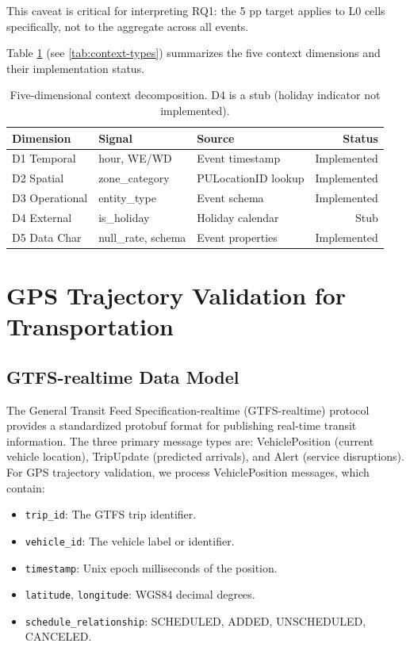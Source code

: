 This caveat is critical for interpreting RQ1: the 5 pp target applies to
L0 cells specifically, not to the aggregate across all events.

Table \ref{tab:context-types} (see \autoref{tab:context-types}) summarizes
the five context dimensions and their implementation status.

\begin{table}[htbp]
  \centering
  \caption{Five-dimensional context decomposition. D4 is a stub
    (holiday indicator not implemented).}
  \label{tab:context-types}
  \begin{tabular}{lllr}
    \toprule
    Dimension       & Signal              & Source             & Status \\
    \midrule
    D1 Temporal    & hour, WE/WD         & Event timestamp    & Implemented \\
    D2 Spatial     & zone\_category      & PULocationID lookup & Implemented \\
    D3 Operational & entity\_type        & Event schema      & Implemented \\
    D4 External   & is\_holiday         & Holiday calendar   & Stub        \\
    D5 Data Char   & null\_rate, schema  & Event properties   & Implemented \\
    \bottomrule
  \end{tabular}
\end{table}

\section{GPS Trajectory Validation for Transportation}
\label{sec:gps-validation}

\subsection{GTFS-realtime Data Model}

The General Transit Feed Specification-realtime (GTFS-realtime) protocol
\citep{gtfsrt_spec} provides a standardized protobuf format for publishing
real-time transit information. The three primary message types are:
VehiclePosition (current vehicle location), TripUpdate (predicted arrivals),
and Alert (service disruptions). For GPS trajectory validation, we process
VehiclePosition messages, which contain:

\begin{itemize}
  \itemsep0em
  \item \texttt{trip\_id}: The GTFS trip identifier.
  \item \texttt{vehicle\_id}: The vehicle label or identifier.
  \item \texttt{timestamp}: Unix epoch milliseconds of the position.
  \item \texttt{latitude}, \texttt{longitude}: WGS84 decimal degrees.
  \item \texttt{schedule\_relationship}: SCHEDULED, ADDED, UNSCHEDULED, CANCELED.
\end{itemize}


